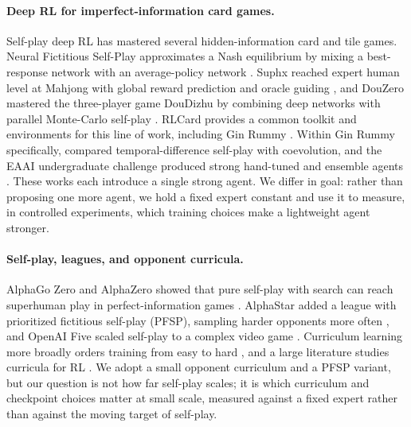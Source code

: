 \documentclass[letterpaper]{article} %
\begin{document}
\paragraph{Deep RL for imperfect-information card games.}
Self-play deep RL has mastered several hidden-information card and tile games.
Neural Fictitious Self-Play approximates a Nash equilibrium by mixing a
best-response network with an average-policy network \citep{nfsp}. Suphx reached
expert human level at Mahjong with global reward prediction and oracle guiding
\citep{suphx}, and DouZero mastered the three-player game DouDizhu by combining
deep networks with parallel Monte-Carlo self-play \citep{douzero}. RLCard
provides a common toolkit and environments for this line of work, including Gin
Rummy \citep{rlcard}. Within Gin Rummy specifically, \citet{tdrummy} compared
temporal-difference self-play with coevolution, and the EAAI undergraduate
challenge produced strong hand-tuned and ensemble agents \citep{ginensemble}.
These works each introduce a single strong agent. We differ in goal: rather than
proposing one more agent, we hold a fixed expert constant and use it to measure,
in controlled experiments, which training choices make a lightweight agent
stronger.

\paragraph{Self-play, leagues, and opponent curricula.}
AlphaGo Zero and AlphaZero showed that pure self-play with search can reach
superhuman play in perfect-information games \citep{alphagozero,alphazero}.
AlphaStar added a league with prioritized fictitious self-play (PFSP), sampling
harder opponents more often \citep{alphastar}, and OpenAI Five scaled self-play
to a complex video game \citep{openaifive}. Curriculum learning more broadly
orders training from easy to hard \citep{curriculum}, and a large literature
studies curricula for RL \citep{curriculumsurvey}. We adopt a small opponent
curriculum and a PFSP variant, but our question is not how far self-play scales;
it is which curriculum and checkpoint choices matter at small scale, measured
against a fixed expert rather than against the moving target of self-play.
\end{document}
